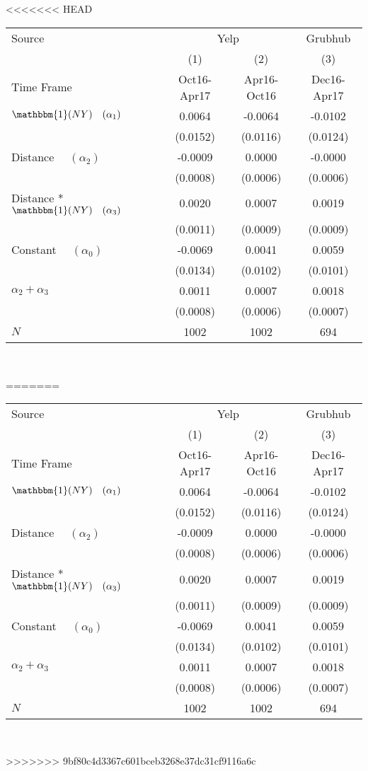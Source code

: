 <<<<<<< HEAD
\begin{center}
\begin{tabular}{lccc}
\hline Source & \multicolumn{2}{c}{Yelp} & Grubhub\\
 & (1) & (2) & (3)\\
Time Frame & Oct16-Apr17 & Apr16-Oct16 & Dec16-Apr17\\
\hline  $ \mathbbm{1}(NY) \quad (\alpha_1) $  & 0.0064 & -0.0064 & -0.0102\\
  & (0.0152) & (0.0116) & (0.0124)\\
 Distance $\quad (\alpha_2) $  & -0.0009 & 0.0000 & -0.0000\\
  & (0.0008) & (0.0006) & (0.0006)\\
 Distance * $ \mathbbm{1}(NY) \quad (\alpha_3) $  & 0.0020 & 0.0007 & 0.0019\\
  & (0.0011) & (0.0009) & (0.0009)\\
 Constant $\quad (\alpha_0) $  & -0.0069 & 0.0041 & 0.0059\\
  & (0.0134) & (0.0102) & (0.0101)\\
\hline  $ \alpha_2 + \alpha_3 $  & 0.0011 & 0.0007 & 0.0018\\
  & (0.0008) & (0.0006) & (0.0007)\\
\hline  $ N $  & 1002 & 1002 & 694\\
\hline\end{tabular}\\
\end{center}
=======
\begin{center}
\begin{tabular}{lccc}
\hline Source & \multicolumn{2}{c}{Yelp} & Grubhub\\
 & (1) & (2) & (3)\\
Time Frame & Oct16-Apr17 & Apr16-Oct16 & Dec16-Apr17\\
\hline  $ \mathbbm{1}(NY) \quad (\alpha_1) $  & 0.0064 & -0.0064 & -0.0102\\
  & (0.0152) & (0.0116) & (0.0124)\\
 Distance $\quad (\alpha_2) $  & -0.0009 & 0.0000 & -0.0000\\
  & (0.0008) & (0.0006) & (0.0006)\\
 Distance * $ \mathbbm{1}(NY) \quad (\alpha_3) $  & 0.0020 & 0.0007 & 0.0019\\
  & (0.0011) & (0.0009) & (0.0009)\\
 Constant $\quad (\alpha_0) $  & -0.0069 & 0.0041 & 0.0059\\
  & (0.0134) & (0.0102) & (0.0101)\\
\hline  $ \alpha_2 + \alpha_3 $  & 0.0011 & 0.0007 & 0.0018\\
  & (0.0008) & (0.0006) & (0.0007)\\
\hline  $ N $  & 1002 & 1002 & 694\\
\hline\end{tabular}\\
\end{center}
>>>>>>> 9bf80c4d3367c601bceb3268e37dc31cf9116a6c
